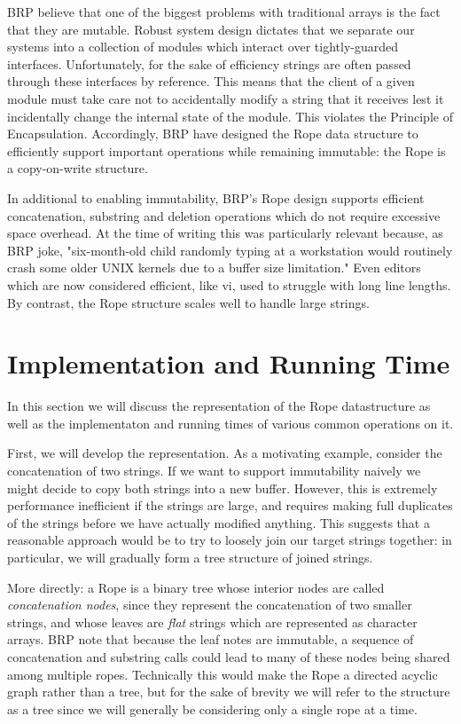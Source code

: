 \documentclass[12pt]{article}
\begin{document}
BRP believe that one of the biggest problems with traditional arrays is the fact that they are mutable. Robust system design dictates that we separate our systems into a collection of modules which interact over tightly-guarded interfaces. Unfortunately, for the sake of efficiency strings are often passed through these interfaces by reference. This means that the client of a given module must take care not to accidentally modify a string that it receives lest it incidentally change the internal state of the module. This violates the Principle of Encapsulation. Accordingly, BRP have designed the Rope data structure to efficiently support important operations while remaining immutable: the Rope is a copy-on-write structure.

In additional to enabling immutability, BRP's Rope design supports efficient concatenation, substring and deletion operations which do not require excessive space overhead. At the time of writing this was particularly relevant because, as BRP joke, "six-month-old child randomly typing at a workstation would routinely crash some older UNIX kernels due to a buffer size limitation." Even editors which are now considered efficient, like vi, used to struggle with long line lengths. By contrast, the Rope structure scales well to handle large strings.

\section{Implementation and Running Time}

In this section we will discuss the representation of the Rope datastructure as well as the implementaton and running times of various common operations on it.

First, we will develop the representation. As a motivating example, consider the concatenation of two strings. If we want to support immutability naively we might decide to copy both strings into a new buffer. However, this is extremely performance inefficient if the strings are large, and requires making full duplicates of the strings before we have actually modified anything. This suggests that a reasonable approach would be to try to loosely join our target strings together: in particular, we will gradually form a tree structure of joined strings.

More directly: a Rope is a binary tree whose interior nodes are called \emph{concatenation nodes}, since they represent the concatenation of two smaller strings, and whose leaves are \emph{flat} strings which are represented as character arrays. BRP note that because the leaf notes are immutable, a sequence of concatenation and substring calls could lead to many of these nodes being shared among multiple ropes. Technically this would make the Rope a directed acyclic graph rather than a tree, but for the sake of brevity we will refer to the structure as a tree since we will generally be considering only a single rope at a time.
\end{document}
